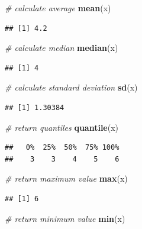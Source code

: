 \documentclass[]{book}
\newenvironment{Shaded}{\begin{snugshade}}{\end{snugshade}}
\newcommand{\KeywordTok}[1]{\textcolor[rgb]{0.13,0.29,0.53}{\textbf{#1}}}
\newcommand{\CommentTok}[1]{\textcolor[rgb]{0.56,0.35,0.01}{\textit{#1}}}
\newcommand{\NormalTok}[1]{#1}
\begin{document}
\begin{Shaded}
\begin{Highlighting}[]
\CommentTok{# calculate average}
\KeywordTok{mean}\NormalTok{(x)}
\end{Highlighting}
\end{Shaded}

\begin{verbatim}
## [1] 4.2
\end{verbatim}

\begin{Shaded}
\begin{Highlighting}[]
\CommentTok{# calculate median}
\KeywordTok{median}\NormalTok{(x)}
\end{Highlighting}
\end{Shaded}

\begin{verbatim}
## [1] 4
\end{verbatim}

\begin{Shaded}
\begin{Highlighting}[]
\CommentTok{# calculate standard deviation}
\KeywordTok{sd}\NormalTok{(x)}
\end{Highlighting}
\end{Shaded}

\begin{verbatim}
## [1] 1.30384
\end{verbatim}

\begin{Shaded}
\begin{Highlighting}[]
\CommentTok{# return quantiles}
\KeywordTok{quantile}\NormalTok{(x)}
\end{Highlighting}
\end{Shaded}

\begin{verbatim}
##   0%  25%  50%  75% 100% 
##    3    3    4    5    6
\end{verbatim}

\begin{Shaded}
\begin{Highlighting}[]
\CommentTok{# return maximum value}
\KeywordTok{max}\NormalTok{(x)}
\end{Highlighting}
\end{Shaded}

\begin{verbatim}
## [1] 6
\end{verbatim}

\begin{Shaded}
\begin{Highlighting}[]
\CommentTok{# return minimum value}
\KeywordTok{min}\NormalTok{(x)}
\end{Highlighting}
\end{Shaded}
\end{document}
